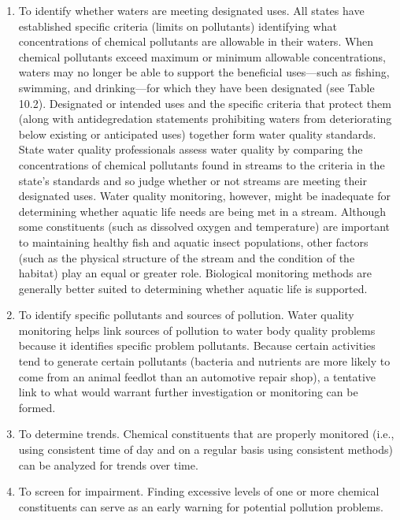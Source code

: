 \documentclass{article}
\begin{document}
\begin{enumerate}
\def\labelenumi{\arabic{enumi}.}
\tightlist
\item
  To identify whether waters are meeting designated uses. All states
  have established specific criteria (limits on pollutants) identifying
  what concentrations of chemical pollutants are allowable in their
  waters. When chemical pollutants exceed maximum or minimum allowable
  concentrations, waters may no longer be able to support the beneficial
  uses---such as fishing, swimming, and drinking---for which they have
  been designated (see Table 10.2). Designated or intended uses and the
  specific criteria that protect them (along with antidegredation
  statements prohibiting waters from deteriorating below existing or
  anticipated uses) together form water quality standards. State water
  quality professionals assess water quality by comparing the
  concentrations of chemical pollutants found in streams to the criteria
  in the state's standards and so judge whether or not streams are
  meeting their designated uses. Water quality monitoring, however,
  might be inadequate for determining whether aquatic life needs are
  being met in a stream. Although some constituents (such as dissolved
  oxygen and temperature) are important to maintaining healthy fish and
  aquatic insect populations, other factors (such as the physical
  structure of the stream and the condition of the habitat) play an
  equal or greater role. Biological monitoring methods are generally
  better suited to determining whether aquatic life is supported.
\item
  To identify specific pollutants and sources of pollution. Water
  quality monitoring helps link sources of pollution to water body
  quality problems because it identifies specific problem pollutants.
  Because certain activities tend to generate certain pollutants
  (bacteria and nutrients are more likely to come from an animal feedlot
  than an automotive repair shop), a tentative link to what would
  warrant further investigation or monitoring can be formed.
\item
  To determine trends. Chemical constituents that are properly monitored
  (i.e., using consistent time of day and on a regular basis using
  consistent methods) can be analyzed for trends over time.
\item
  To screen for impairment. Finding excessive levels of one or more
  chemical constituents can serve as an early warning for potential
  pollution problems.
\end{enumerate}
\end{document}
